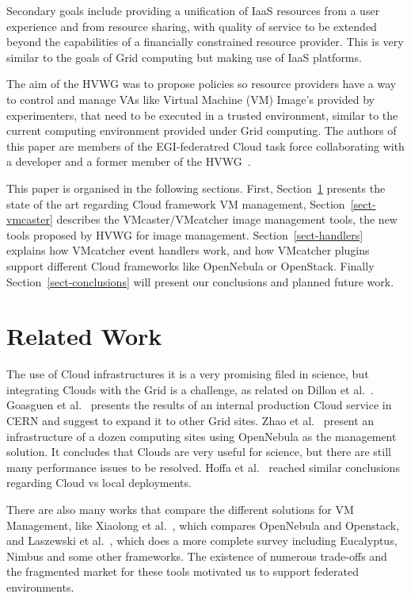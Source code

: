 \documentclass{cai}
\begin{document}
Secondary goals include providing a unification of IaaS resources from a user experience and from resource sharing, with quality of service to be extended beyond the capabilities of a financially constrained resource provider.
This is very similar to the goals of Grid computing but making use of IaaS platforms.

The aim of the HVWG was to propose policies so resource providers have a way to control and manage VAs like Virtual Machine (VM) Image's provided by experimenters, that need to be executed in a trusted environment, similar to the current computing environment provided under Grid computing. 
The authors of this paper are members of the EGI-federatred Cloud task force collaborating with a developer and a former member of the HVWG~\cite{hepix}.

This paper is organised in the following sections. First, Section~\ref{sect-relatedwork} presents the state of the art regarding Cloud framework VM management, Section~\ref{sect-vmcaster} describes the VMcaster/VMcatcher image management tools, the new tools proposed by HVWG for image management. 
Section~\ref{sect-handlers} explains how VMcatcher event handlers work, and how VMcatcher plugins support different Cloud frameworks like OpenNebula or OpenStack.
Finally Section~\ref{sect-conclusions} will present our conclusions and planned future work.

\section{Related Work}
\label{sect-relatedwork}
The use of Cloud infrastructures it is a very promising filed in science, but integrating Clouds with the Grid is a challenge, as related on Dillon et al.~\cite{Dillon2010}. Goasguen et al.~\cite{Goasguen2012} presents the results of an internal production Cloud service in CERN and suggest to expand it to other Grid sites. Zhao et al.~\cite{Zhao2012} present an infrastructure of a dozen computing sites using OpenNebula as the management solution. It concludes that Clouds are very useful for science, but there are still many performance issues to be resolved. Hoffa et al.~\cite{Hoffa2008} reached similar conclusions regarding Cloud vs local deployments.

There are also many works that compare the different solutions for VM Management, like Xiaolong et al.~\cite{Xiaolong2012}, which compares OpenNebula and Openstack, and Laszewski et al.~\cite{Laszewski2012}, which does a more complete survey including Eucalyptus, Nimbus and some other frameworks. The existence of numerous trade-offs and the fragmented market for these tools motivated us to support federated environments.
\end{document}

